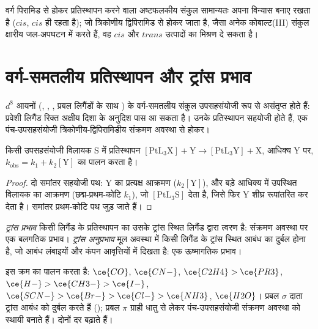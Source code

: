 वर्ग पिरामिड से होकर प्रतिस्थापन करने वाला अष्टफलकीय संकुल सामान्यतः
अपना विन्यास बनाए रखता है ($cis$, $cis$ ही रहता है); जो त्रिकोणीय
द्विपिरामिड से होकर जाता है, जैसा अनेक कोबाल्ट(III) संकुल क्षारीय जल-अपघटन में करते हैं, वह
$cis$ और $trans$ उत्पादों का मिश्रण दे सकता है।

\section{वर्ग-समतलीय प्रतिस्थापन और ट्रांस प्रभाव}

$d^8$ आयनों (, , , प्रबल लिगैंडों के साथ ) के वर्ग-समतलीय संकुल
उपसहसंयोजी रूप से असंतृप्त होते हैं: प्रवेशी लिगैंड रिक्त अक्षीय दिशा के अनुदिश
पास आ सकता है। उनके प्रतिस्थापन सहयोजी होते हैं, एक
पंच-उपसहसंयोजी त्रिकोणीय-द्विपिरामिडीय संक्रमण अवस्था से होकर।

\begin{proposition}[द्वि-पद दर नियम]\label{prop:b3:complex-mechanisms:square-planar}
किसी उपसहसंयोजी विलायक S में प्रतिस्थापन $\mathrm{[PtL_3X] + Y \to [PtL_3Y] + X}$, आधिक्य Y पर,
$k_{\mathrm{obs}} = k_1 + k_2[\mathrm Y]$ का पालन करता है।
\end{proposition}

\begin{proof}
दो समांतर सहयोजी पथ: Y का प्रत्यक्ष आक्रमण ($k_2[\mathrm Y]$), और
बड़े आधिक्य में उपस्थित विलायक का आक्रमण (छद्म-प्रथम-कोटि $k_1$), जो $[\mathrm{PtL_3S}]$ देता है, जिसे
फिर Y शीघ्र रूपांतरित कर देता है। समांतर प्रथम-कोटि पथ जुड़ जाते हैं।
\end{proof}

\begin{definition}[ट्रांस प्रभाव, ट्रांस अनुप्रभाव]\label{def:b3:complex-mechanisms:trans-effect}
\emph{ट्रांस प्रभाव} किसी लिगैंड के प्रतिस्थापन का उसके
ट्रांस स्थित लिगैंड द्वारा त्वरण है: संक्रमण अवस्था पर एक बलगतिक प्रभाव।
\emph{ट्रांस अनुप्रभाव} मूल अवस्था में किसी लिगैंड के
ट्रांस स्थित आबंध का दुर्बल होना है, जो आबंध लंबाइयों और कंपन
आवृत्तियों में दिखता है: एक ऊष्मागतिक प्रभाव।
\end{definition}

 इस क्रम का पालन करता है: $\ce{CO}$, $\ce{CN-}$, $\ce{C2H4} > \ce{PR3}$, $\ce{H-} > \ce{CH3-} > \ce{I-}$, $\ce{SCN-} >
\ce{Br-} > \ce{Cl-} > \ce{NH3}$, $\ce{H2O}$। प्रबल $\sigma$ दाता ट्रांस आबंध को दुर्बल करते हैं ();
प्रबल $\pi$ ग्राही धातु से  लेकर पंच-उपसहसंयोजी संक्रमण अवस्था को
स्थायी बनाते हैं। दोनों दर बढ़ाते हैं।

